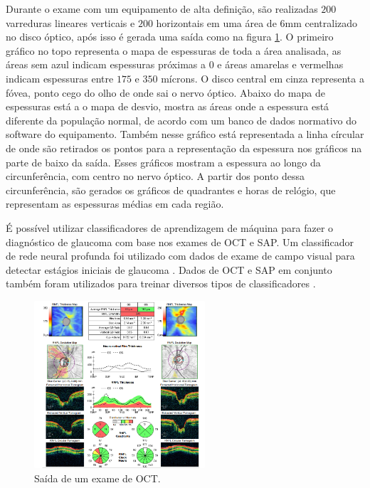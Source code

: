 \documentclass[conference]{IEEEtran}
\begin{document}
Durante o exame com um equipamento de alta definição, são realizadas $200$ varreduras lineares verticais e $200$ horizontais em uma área de 6mm centralizado no disco óptico, após isso é gerada uma saída como na figura \ref{fig:oct}. O primeiro gráfico no topo representa o mapa de espessuras de toda a área analisada, as áreas sem azul indicam espessuras próximas a $0$ e áreas amarelas e vermelhas indicam espessuras entre $175$ e $350$ mícrons. O disco central em cinza representa a fóvea, ponto cego do olho de onde sai o nervo óptico. Abaixo do mapa de espessuras está a o mapa de desvio, mostra as áreas onde a espessura está diferente da população normal, de acordo com um banco de dados normativo do software do equipamento. Também nesse gráfico está representada a linha círcular de onde são retirados os pontos para a representação da espessura nos gráficos na parte de baixo da saída. Esses gráficos mostram a espessura ao longo da circunferência, com centro no nervo óptico. A partir dos ponto dessa circunferência, são gerados os gráficos de quadrantes e horas de relógio, que representam as espessuras médias em cada região.

É possível utilizar classificadores de aprendizagem de máquina para fazer o diagnóstico de glaucoma com base nos exames de OCT e SAP. Um classificador de rede neural profunda foi utilizado com dados de exame de campo visual para detectar estágios iniciais de glaucoma \cite{Asaoka2016}. Dados de OCT e SAP em conjunto também foram utilizados para treinar diversos tipos de classificadores \cite{bowd2008,Populacoes2009}. %


\begin{figure}[!tp]
  \centering
  \includegraphics[width=2.5in]{img/oct.png}
  \caption{Saída de um exame de OCT.}
  \label{fig:oct}
\end{figure}
\end{document}
